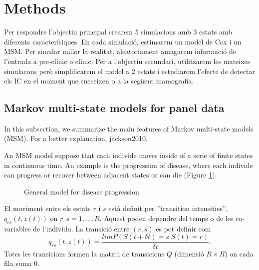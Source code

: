 \documentclass[10pt,a4paper]{article}
\begin{document}
\section{Methods}
% 
Per respondre l'objectiu principal crearem 5 simulacions amb 3 estats amb diferents caracterísiques.
En cada simulació, estimarem un model de Cox i un MSM. Per simular millor la realitat,
aleatoriament amagarem informació de l'entrada a pre-clínic o clínic. Per a l'objectiu secundari,
utilitzarem les mateixes simulacons però simplificarem el model a 2 estats i estudiarem l'efecte de
detectar els IC en el moment que succeixen o a la següent mamografia.

\subsection{Markov multi-state models for panel data}
In this subsection, we summarize the main features of Markov multi-state models (MSM). For a better
explanation, jackson2010.

An MSM model suppose that each individe moves inside of a serie of finite states in continuous
time. An example is the progression of disease, where each individe can progress or recover between
adjacent states or can die (Figure \ref{fig_msm}).

\begin{figure}

\caption{General model for disease progression.}
\label{fig_msm} 
\end{figure}

El moviment entre els estats $r$ i $s$ està definit per ''transition intensities'',
$q_{rs}(t, z(t))$ on $r,s = 1,..., R$. Aquest poden dependre del temps o de les co-variables de
l'individu. La transició entre $(r,s)$ es pot definir com
\[q_{rs}(t, z(t)) = \frac{lim P(S(t + \delta t) = s|S(t) = r)}{\delta t}.\]
Totes les transicions formen la matriu de transicions $Q$ (dimensió $R\times R$) on cada fila suma 0.

\end{document}

